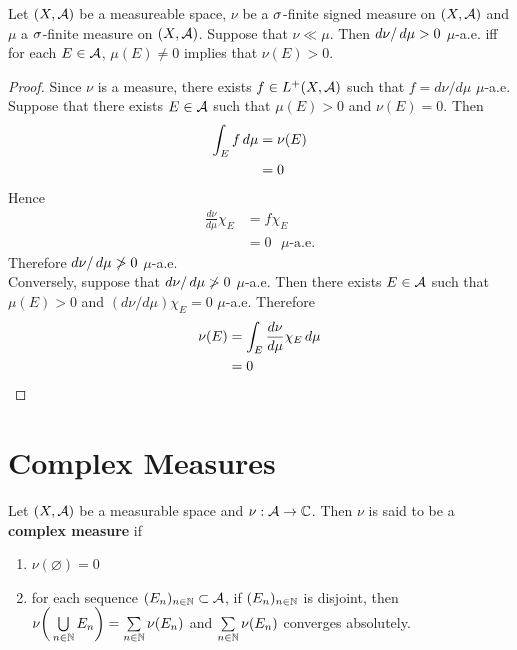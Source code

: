 \documentclass{book}
\begin{document}
	\begin{ex}
		Let $(X, \mathcal{A})$ be a measureable space, $\nu$ be a $\sigma$-finite signed measure on $(X, \mathcal{A})$ and $\mu$ a $\sigma$-finite measure on $(X,\mathcal{A})$. Suppose that $\nu \ll \mu$. Then $d\nu / \, d \mu > 0$ $\mu$-a.e. iff for each $E \in \mathcal{A}$, $\mu(E) \neq 0$ implies that $\nu(E) > 0$. 
	\end{ex}

	\begin{proof}
		Since $\nu$ is a measure, there exists $f \in L^+(X, \mathcal{A})$ such that $f = d\nu/ d\mu$ $\mu$-a.e. Suppose that there exists $E \in \mathcal{A}$ such that $\mu(E) > 0$ and $\nu(E) = 0$. Then 
		\begin{align*}
			\int_E f \, d \mu  
			& = \nu(E) \\
			& = 0 
		\end{align*}
		Hence 
		\begin{align*}
			\frac{d \nu}{d\mu}\chi_E 
			& = f \chi_E \\
			& = 0 \text{ $\mu$-a.e.}
		\end{align*} 
		Therefore $d\nu / \, d \mu \not > 0$ $\mu$-a.e.\\
		Conversely, suppose that $d\nu / \, d \mu \not > 0$ $\mu$-a.e. Then there exists $E \in \mathcal{A}$ such that $\mu(E) > 0$ and $(d \nu / d\mu)\chi_E = 0$ $\mu$-a.e. Therefore 
		\begin{align*}
			\nu(E)
			& = \int_E \frac{d \nu}{d\mu}\chi_E  \, d \mu \\
			& = 0
		\end{align*}
	\end{proof}

	
	
	
	
	
	
	
	
	
	
	\newpage	
	\section{Complex Measures}
	
	\begin{defn}  
		Let $(X, \mathcal{A})$ be a measurable space and $\nu:\mathcal{A} \rightarrow \mathbb{C}$. Then $\nu$ is said to be a \textbf{complex measure} if 
		\begin{enumerate}
			\item $\nu (\varnothing) = 0$
			\item for each sequence $(E_n)_{n \in \mathbb{N}} \subset \mathcal{A}$, if $(E_n)_{n \in \mathbb{N}}$ is disjoint, then $\nu \bigg( \bigcup\limits_{n \in \mathbb{N}} E_n \bigg) = \sum\limits_{n \in \mathbb{N}} \nu(E_n)$ and $\sum\limits_{n \in \mathbb{N}} \nu(E_n)$ converges absolutely. 
		\end{enumerate}
	\end{defn}
\end{document}
